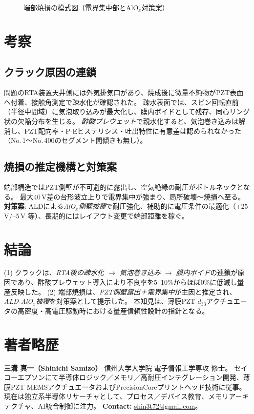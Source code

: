 \documentclass[11pt,a4paper]{ltjsarticle} %
\begin{document}
\begin{figure}[h]
  \centering
  
  \caption{端部焼損の模式図（電界集中部とAlO$_x$対策案）}
  \label{fig:edge}
\end{figure}

\section{考察}
\subsection{クラック原因の連鎖}
問題のRTA装置天井側には外気排気口があり、焼成後に微量不純物がPZT表面へ付着、接触角測定で疎水化が確認された。
疎水表面では、スピン回転直前（半径中間域）に気泡取り込みが最大化し、膜内ボイドとして残存、同心リング状の欠陥分布を生じる。
\emph{酢酸プレウェット}で親水化すると、気泡巻き込みは解消し、PZT配向率・P-Eヒステリシス・吐出特性に有意差は認められなかった（No.\,1～No.\,400のセグメント間傾きも無し）。

\subsection{焼損の推定機構と対策案}
端部構造ではPZT側壁が不可避的に露出し、空気絶縁の耐圧がボトルネックとなる。
最大40\,V差の台形波立上りで電界集中が強まり、局所破壊～焼損へ至る。
\textbf{対策案}: ALDによる\emph{AlO$_x$側壁被覆}で耐圧強化、補助的に電圧条件の最適化（+25\,V/--5\,V 等）、長期的にはレイアウト変更で端部距離を稼ぐ。

\section{結論}
(1) クラックは、\emph{RTA後の疎水化 $\rightarrow$ 気泡巻き込み $\rightarrow$ 膜内ボイド}の連鎖が原因であり、酢酸プレウェット導入により不良率を5--10\%からほぼ0\%に低減し量産反映した。
(2) 端部焼損は、\emph{PZT側壁露出＋電界集中}が主因と推定され、\emph{ALD-AlO$_x$被覆}を対策案として提示した。
本知見は、薄膜PZT $d_{33}$アクチュエータの高密度・高電圧駆動時における量産信頼性設計の指針となる。

\section*{著者略歴}
\textbf{三溝 真一（Shinichi Samizo）} 信州大学大学院 電子情報工学専攻 修士。
セイコーエプソンにて半導体ロジック／メモリ／高耐圧インテグレーション開発、薄膜PZT MEMSアクチュエータおよびPrecisionCoreプリントヘッド技術に従事。
現在は独立系半導体リサーチャとして、プロセス／デバイス教育、メモリアーキテクチャ、AI統合制御に注力。
\textbf{Contact:} \href{mailto:shin3t72@gmail.com}{shin3t72@gmail.com}。
\end{document}

